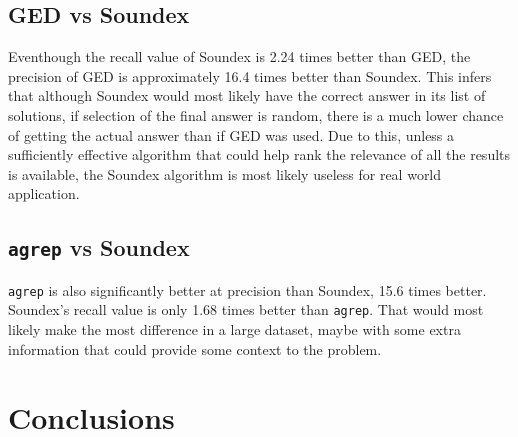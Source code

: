 \documentclass[11pt]{article}
\begin{document}
\subsection{GED vs Soundex}
Eventhough the recall value of Soundex is 2.24 times better than GED, the precision of GED is approximately 16.4 times better than Soundex. This infers that although Soundex would most likely have the correct answer in its list of solutions, if selection of the final answer is random, there is a much lower chance of getting the actual answer than if GED was used. Due to this, unless a sufficiently effective algorithm that could help rank the relevance of all the results is available, the Soundex algorithm is most likely useless for real world application. %

\subsection{\texttt{agrep} vs Soundex}
\texttt{agrep} is also significantly better at precision than Soundex, 15.6 times better. Soundex's recall value is only 1.68 times better than \texttt{agrep}. That would most likely make the most difference in a large dataset, maybe with some extra information that could provide some context to the problem. %

\section{Conclusions}





\end{document}
